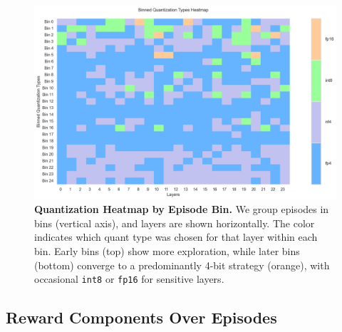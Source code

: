 \documentclass{article}
\begin{document}
	\begin{figure}[ht]
		\centering
		\includegraphics[width=1.0\columnwidth]{images/gpt2-medium-250-gae-ewa-rwd-v1/binned_heatmap.png}
		\caption{\small
			\textbf{Quantization Heatmap by Episode Bin.}
			We group episodes in bins (vertical axis), and layers are shown horizontally. 
			The color indicates which quant type was chosen for that layer within each bin. 
			Early bins (top) show more exploration, while later bins (bottom) converge to a predominantly 4-bit strategy (orange), with occasional \texttt{int8} or \texttt{fp16} for sensitive layers.
		}
		\label{fig:gpt2medium-binned-heatmap}
	\end{figure}
	
	\subsection{Reward Components Over Episodes}
	\label{sec:medium-rewards}
	
\end{document}
